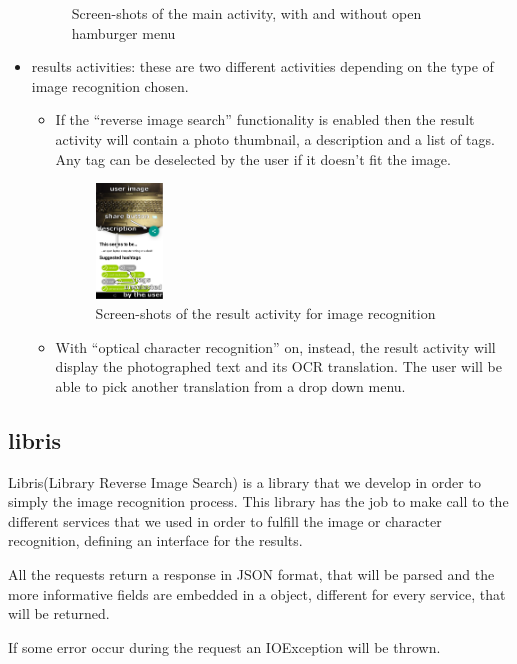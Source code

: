 \begin{itemize}
\begin{figure}[h]
        \caption{Screen-shots of the main activity, with and without open 
                 hamburger menu}
        \label{fig:mainActivity}
    \end{figure}
  \item results activities: these are two different activities depending on
    the type of image recognition chosen.
    \begin{itemize}
     \item If the ``reverse image search'' functionality is enabled then the
result activity will contain a photo thumbnail, a description and a list of
tags. Any tag can be deselected by the user if it doesn't fit the image.
    \begin{figure}[h]
        \centering
        \includegraphics[width=0.18\textwidth]{../img/image_result_activity}
        \caption{Screen-shots of the result activity for image recognition}
        \label{fig:imageResultActivity}
    \end{figure}
     \item With ``optical character recognition'' on, instead, the result
activity will display the photographed text and its OCR translation. The user
will be able to pick another translation from a drop down menu.
    \end{itemize}
\end{itemize}

\subsection{libris}
Libris(Library Reverse Image Search) is a library that we develop in order to 
simply the image recognition process. This library has the job to make call to 
the different services that we used in order to fulfill the image or character 
recognition, defining an interface for the results.

All the requests return a response in JSON format, that will be parsed and the 
more informative fields are embedded in a object, different for every service, 
that will be returned. 

If some error occur during the request an IOException will be thrown.


